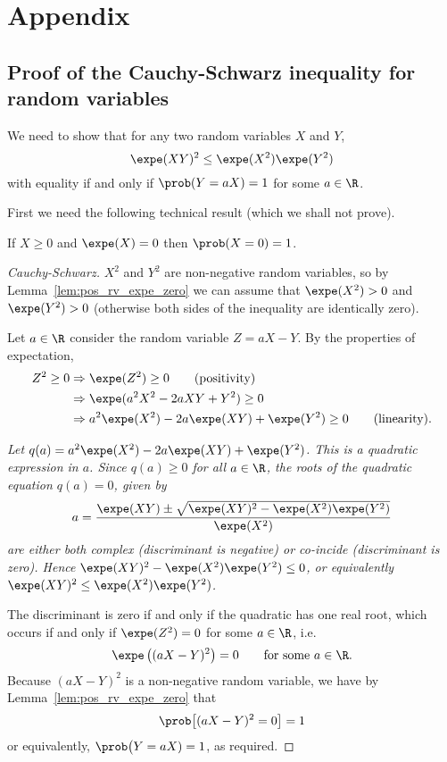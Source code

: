 
\section{Appendix}\label{sec:}

\subsection{Proof of the Cauchy-Schwarz inequality for random variables}

We need to show that for any two random variables $X$ and $Y$,
\[
\expe(XY)^2 \leq \expe(X^2)\expe(Y^2)
\]
with equality if and only if $\prob(Y=aX)=1$ for some $a\in\R$.

First we need the following technical result (which we shall not prove).
\begin{lemma}\label{lem:pos_rv_expe_zero}
If $X\geq 0$ and $\expe(X)=0$ then $\prob(X=0)=1$.
\end{lemma}

\begin{proof}[Cauchy-Schwarz]
$X^2$ and $Y^2$ are non-negative random variables, so by Lemma~\ref{lem:pos_rv_expe_zero} we can assume that $\expe(X^2)>0$ and $\expe(Y^2)>0$ (otherwise both sides of the inequality are identically zero).

Let $a\in\R$ consider the random variable $Z=aX-Y$. By the properties of expectation,
\begin{align*}
Z^2\geq 0 
	& \Rightarrow \expe(Z^2)\geq 0  \qquad\text{(positivity)}\\
	& \Rightarrow \expe(a^2X^2 - 2aXY + Y^2) \geq 0  \\
	& \Rightarrow a^2\expe(X^2) - 2a\expe(XY) + \expe(Y^2) \geq 0 \qquad\text{(linearity).}
\end{align*}

\bit
\it Let $q(a)=a^2\expe(X^2) - 2a\expe(XY) + \expe(Y^2)$. This is a quadratic expression in $a$.
\eit
Since $q(a)\geq 0$ for all $a\in\R$, the roots of the quadratic equation $q(a)=0$, given by
\[
a = \frac{\expe(XY)\pm\sqrt{\expe(XY)^2-\expe(X^2)\expe(Y^2)}}{\expe(X^2)}
\]
are either both complex (discriminant is negative) or co-incide (discriminant is zero). 
\bit
\it Hence $\expe(XY)^2-\expe(X^2)\expe(Y^2) \leq 0$, or equivalently $\expe(XY)^2\leq \expe(X^2)\expe(Y^2)$.
\eit

The discriminant is zero if and only if the quadratic has one real root, which occurs if and only if $\expe(Z^2)=0$ for some $a\in\R$, i.e.
\[
\expe\left((aX-Y)^2\right) = 0\qquad\text{for some $a\in\R$.}
\]
Because $(aX-Y)^2$ is a non-negative random variable, we have by Lemma~\ref{lem:pos_rv_expe_zero} that
\[
\prob\big[(aX-Y)^2 = 0\big] = 1
\]
or equivalently, $\prob\big(Y = aX) = 1$, as required. 
\end{proof}
